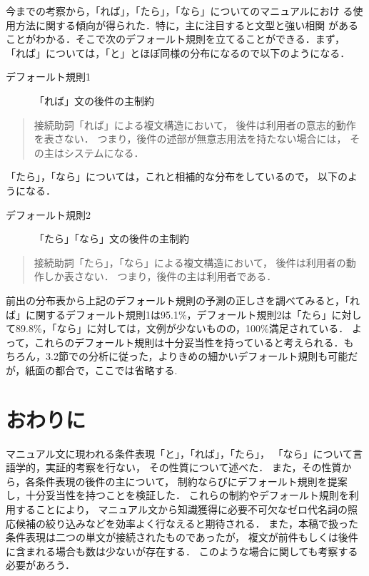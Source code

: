 今までの考察から，「れば」，「たら」，「なら」についてのマニュアルにおけ
る使用方法に関する傾向が得られた．特に，{\dg 主}に注目すると文型と強い相関
があることがわかる．そこで次のデフォールト規則を立てることができる．まず，
「れば」については，「と」とほぼ同様の分布になるので以下のようになる．
\begin{description}
\item[デフォールト規則1] 「れば」文の後件の{\dg 主}制約  
\end{description}
\begin{quote}
  接続助詞「れば」による複文構造において，
  後件は利用者の意志的動作を表さない．
  つまり，後件の述部が無意志用法を持たない場合には，
  その{\dg 主}はシステムになる．
\end{quote}
「たら」，「なら」については，これと相補的な分布をしているので，
以下のようになる．
\begin{description}
\item[デフォールト規則2] 「たら」「なら」文の後件の{\dg 主}制約  
\end{description}
\begin{quote}
  接続助詞「たら」，「なら」による複文構造において，
  後件は利用者の動作しか表さない．
  つまり，後件の{\dg 主}は利用者である．
\end{quote}

前出の分布表から上記のデフォールト規則の予測の正しさを調べてみると，「れ
ば」に関するデフォールト規則1は95.1\%，デフォールト規則2は「たら」に対し
て89.8\%，「なら」に対しては，文例が少ないものの，100\%満足されている．
よって，これらのデフォールト規則は十分妥当性を持っていると考えられる．も
ちろん，3.2節での分析に従った，よりきめの細かいデフォールト規則も可能だ
が，紙面の都合で，ここでは省略する.

\section{おわりに}

マニュアル文に現われる条件表現「と」，「れば」，「たら」，
「なら」について言語学的，実証的考察を行ない，
その性質について述べた．
また，その性質から，各条件表現の後件の{\dg 主}について，
制約ならびにデフォールト規則を提案し，十分妥当性を持つことを検証した．
これらの制約やデフォールト規則を利用することにより，
マニュアル文から知識獲得に必要不可欠なゼロ代名詞の照応候補の絞り込みなどを効率よく行なえると期待される．
また，本稿で扱った条件表現は二つの単文が接続されたものであったが，
複文が前件もしくは後件に含まれる場合も数は少ないが存在する．
このような場合に関しても考察する必要があろう．




